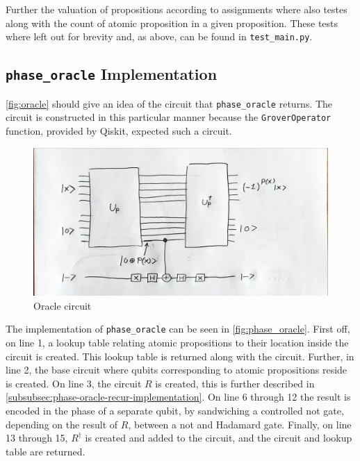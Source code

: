 Further the valuation of propositions according to assignments where also testes along with the count of atomic proposition in a given proposition.
These tests where left out for brevity and, as above, can be found in \texttt{test\_main.py}.

\subsection{\texttt{phase\_oracle} Implementation}\label{subsec:phase-oracle}

\autoref{fig:oracle} should give an idea of the circuit that \texttt{phase\_oracle} returns.
The circuit is constructed in this particular manner because the \texttt{GroverOperator} function, provided by Qiskit, expected such a circuit.

\begin{figure}[H]
    \centering
    \includegraphics[width=\textwidth]{figures/garbage-free-computation.jpg}
    \caption{Oracle circuit}
    \label{fig:oracle}
\end{figure}

The implementation of \texttt{phase\_oracle} can be seen in \autoref{fig:phase_oracle}.
First off, on line 1, a lookup table relating atomic propositions to their location inside the circuit is created.
This lookup table is returned along with the circuit.
Further, in line 2, the base circuit where qubits corresponding to atomic propositions reside is created.
On line 3, the circuit $R$ is created, this is further described in \autoref{subsubsec:phase-oracle-recur-implementation}.
On line 6 through 12 the result is encoded in the phase of a separate qubit, by sandwiching a controlled not gate, depending on the result of $R$, between a not and Hadamard gate.
Finally, on line 13 through 15, $R^\dagger$ is created and added to the circuit, and the circuit and lookup table are returned.

